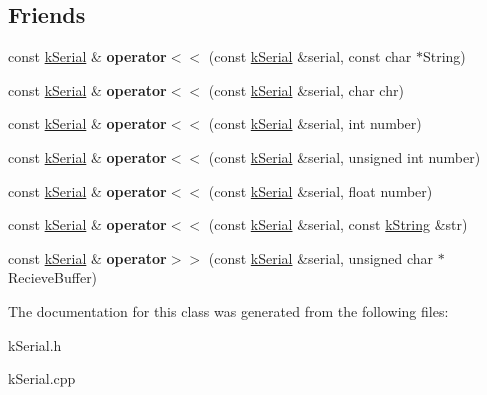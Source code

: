 \subsection*{Friends}
\begin{DoxyCompactItemize}
\item 
const \hyperlink{classkSerial}{k\+Serial} \& {\bfseries operator$<$$<$} (const \hyperlink{classkSerial}{k\+Serial} \&serial, const char $\ast$String)\hypertarget{classkSerial_a8b40c3dad3d1cd414d834b0fd8f4f91c}{}\label{classkSerial_a8b40c3dad3d1cd414d834b0fd8f4f91c}

\item 
const \hyperlink{classkSerial}{k\+Serial} \& {\bfseries operator$<$$<$} (const \hyperlink{classkSerial}{k\+Serial} \&serial, char chr)\hypertarget{classkSerial_a7f6a6e6486452425901a677eb779457e}{}\label{classkSerial_a7f6a6e6486452425901a677eb779457e}

\item 
const \hyperlink{classkSerial}{k\+Serial} \& {\bfseries operator$<$$<$} (const \hyperlink{classkSerial}{k\+Serial} \&serial, int number)\hypertarget{classkSerial_aaefbd5d6b74a911347bcddc293c41c86}{}\label{classkSerial_aaefbd5d6b74a911347bcddc293c41c86}

\item 
const \hyperlink{classkSerial}{k\+Serial} \& {\bfseries operator$<$$<$} (const \hyperlink{classkSerial}{k\+Serial} \&serial, unsigned int number)\hypertarget{classkSerial_ad55510d768242c9912ed41eccaf6a8e5}{}\label{classkSerial_ad55510d768242c9912ed41eccaf6a8e5}

\item 
const \hyperlink{classkSerial}{k\+Serial} \& {\bfseries operator$<$$<$} (const \hyperlink{classkSerial}{k\+Serial} \&serial, float number)\hypertarget{classkSerial_a2f0d18a34807ea34cad6f67d2697d07a}{}\label{classkSerial_a2f0d18a34807ea34cad6f67d2697d07a}

\item 
const \hyperlink{classkSerial}{k\+Serial} \& {\bfseries operator$<$$<$} (const \hyperlink{classkSerial}{k\+Serial} \&serial, const \hyperlink{classkString}{k\+String} \&str)\hypertarget{classkSerial_a91035244854fd17104dc4de46c38a202}{}\label{classkSerial_a91035244854fd17104dc4de46c38a202}

\item 
const \hyperlink{classkSerial}{k\+Serial} \& {\bfseries operator$>$$>$} (const \hyperlink{classkSerial}{k\+Serial} \&serial, unsigned char $\ast$Recieve\+Buffer)\hypertarget{classkSerial_a1b40cd4ab194604a1d07dc6dc73b975d}{}\label{classkSerial_a1b40cd4ab194604a1d07dc6dc73b975d}

\end{DoxyCompactItemize}


The documentation for this class was generated from the following files\+:\begin{DoxyCompactItemize}
\item 
k\+Serial.\+h\item 
k\+Serial.\+cpp\end{DoxyCompactItemize}
